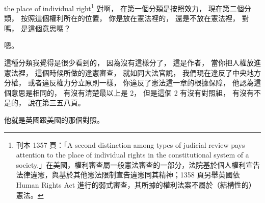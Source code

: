 \hypertarget{w06:cue:1045}{}the place of individual right\footnote{刊本 1357 頁：「A second distinction among types of judicial review pays attention to the place of individual rights in the constitutional system of a society.」在美國，權利審查屬一般憲法審查的一部分，法院基於個人權利宣告法律違憲，與基於其他憲法限制宣告違憲同其精神；1358 頁另舉英國依 Human Rights Act 進行的弱式審查，其所據的權利法案不屬於（結構性的）憲法。}
\hypertarget{w06:cue:1046}{}對啊，
\hypertarget{w06:cue:1047}{}在第一個分類是按照效力，
\hypertarget{w06:cue:1048}{}現在第二個分類，
\hypertarget{w06:cue:1049}{}按照這個權利所在的位置，
\hypertarget{w06:cue:1050}{}你是放在憲法裡的，
\hypertarget{w06:cue:1051}{}還是不放在憲法裡，
\hypertarget{w06:cue:1052}{}對嗎，
\hypertarget{w06:cue:1053}{}是這個意思嗎？

\hypertarget{w06:cue:1054}{}嗯。

\hypertarget{w06:cue:1055}{}這種分類我覺得是很少看到的，
\hypertarget{w06:cue:1056}{}因為沒有這樣分了，
\hypertarget{w06:cue:1057}{}這是作者，
\hypertarget{w06:cue:1058}{}當你把人權放進憲法裡，
\hypertarget{w06:cue:1059}{}這個時候所做的違憲審查，
\hypertarget{w06:cue:1060}{}就如同大法官說，
\hypertarget{w06:cue:1061}{}我們現在違反了中央地方分權，
\hypertarget{w06:cue:1062}{}或者違反權力分立原則一樣，
\hypertarget{w06:cue:1063}{}你違反了憲法這一章的根據保障，
\hypertarget{w06:cue:1064}{}他認為這個意思是相同的，
\hypertarget{w06:cue:1065}{}有沒有清楚最以上是 2，
\hypertarget{w06:cue:1066}{}但是這個 2 有沒有對照組，
\hypertarget{w06:cue:1067}{}有沒有不是的，
\hypertarget{w06:cue:1068}{}說在第三五八頁。

\hypertarget{w06:cue:1069}{}他就是英國跟美國的那個對照。

